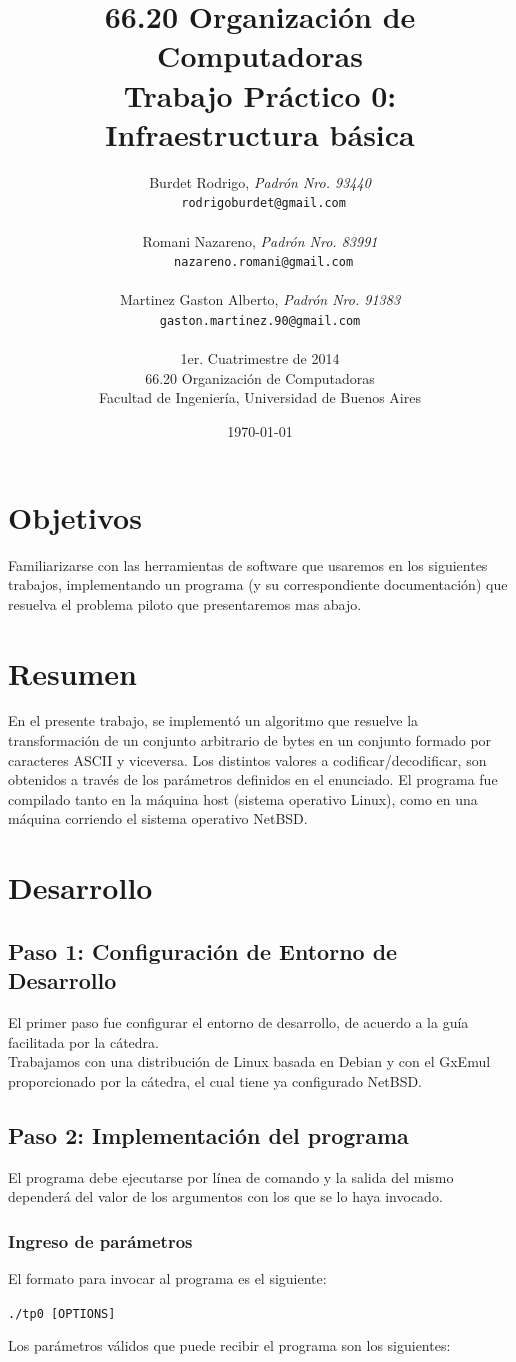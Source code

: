 \documentclass[a4paper,10pt,oneside]{article}
\title{\textbf{66.20 Organización de Computadoras\\ Trabajo Práctico 0: \\ Infraestructura básica}}
\author{	Burdet Rodrigo, \textit{Padrón Nro. 93440}\\
            \texttt{ rodrigoburdet@gmail.com}\\\\
            Romani Nazareno, \textit{Padrón Nro. 83991}                     \\
            \texttt{ nazareno.romani@gmail.com}\\\\
            Martinez Gaston Alberto, \textit{Padrón Nro. 91383}                     \\
            \texttt{ gaston.martinez.90@gmail.com }\\\\[2.5ex]
            \normalsize{1er. Cuatrimestre de 2014}                       \\
            \normalsize66.20 Organización de Computadoras\\
            \normalsize{Facultad de Ingeniería, Universidad de Buenos Aires}            \\
       }
\date{\today}
\begin{document}
\maketitle

\thispagestyle{empty}

\newpage

\section{Objetivos}
    Familiarizarse con las herramientas de software que usaremos en los siguientes trabajos, implementando un programa (y su correspondiente documentación) que resuelva el problema piloto que presentaremos mas abajo.

\section{Resumen}
    En el presente trabajo, se implementó un algoritmo que resuelve la transformación de un conjunto arbitrario de bytes en un conjunto formado por caracteres ASCII y viceversa. Los distintos valores a codificar/decodificar,  son obtenidos a través de los parámetros definidos en el enunciado.
    El programa fue compilado tanto en la máquina host (sistema operativo Linux), como en una máquina corriendo el sistema operativo NetBSD.

\section{Desarrollo}
	
\subsection{Paso 1: Configuración de Entorno de Desarrollo}
El primer paso fue configurar el entorno de desarrollo, de acuerdo a la guía facilitada por la cátedra. \\
Trabajamos con una distribución de Linux basada en Debian y con el GxEmul proporcionado por la cátedra, el cual tiene ya configurado NetBSD.
	
\subsection{Paso 2: Implementación del programa}
El programa debe ejecutarse por línea de comando y la salida del mismo dependerá del valor de los argumentos con los que se lo haya invocado.
\subsubsection{Ingreso de parámetros}
El formato para invocar al programa es el siguiente:
\begin{center}
	\texttt{./tp0 [OPTIONS]}
\end{center}
Los parámetros válidos que puede recibir el programa son los siguientes: \\ 
\end{document}
